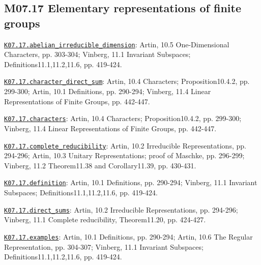 \subsection*{M07.17 Elementary representations of finite groups}
\par\smallskip\noindent\hypertarget{src:K07.17.abelian_irreducible_dimension}{}\label{src:K07.17.abelian_irreducible_dimension}\hyperref[K07.17.abelian_irreducible_dimension]{\texttt{K07.17.abelian\_irreducible\_dimension}}: Artin, 10.5 One-Dimensional Characters, pp. 303-304; Vinberg, 11.1 Invariant Subspaces; Definitions11.1,11.2,11.6, pp. 419-424.
\par\smallskip\noindent\hypertarget{src:K07.17.character_direct_sum}{}\label{src:K07.17.character_direct_sum}\hyperref[K07.17.character_direct_sum]{\texttt{K07.17.character\_direct\_sum}}: Artin, 10.4 Characters; Proposition10.4.2, pp. 299-300; Artin, 10.1 Definitions, pp. 290-294; Vinberg, 11.4 Linear Representations of Finite Groups, pp. 442-447.
\par\smallskip\noindent\hypertarget{src:K07.17.characters}{}\label{src:K07.17.characters}\hyperref[K07.17.characters]{\texttt{K07.17.characters}}: Artin, 10.4 Characters; Proposition10.4.2, pp. 299-300; Vinberg, 11.4 Linear Representations of Finite Groups, pp. 442-447.
\par\smallskip\noindent\hypertarget{src:K07.17.complete_reducibility}{}\label{src:K07.17.complete_reducibility}\hyperref[K07.17.complete_reducibility]{\texttt{K07.17.complete\_reducibility}}: Artin, 10.2 Irreducible Representations, pp. 294-296; Artin, 10.3 Unitary Representations; proof of Maschke, pp. 296-299; Vinberg, 11.2 Theorem11.38 and Corollary11.39, pp. 430-431.
\par\smallskip\noindent\hypertarget{src:K07.17.definition}{}\label{src:K07.17.definition}\hyperref[K07.17.definition]{\texttt{K07.17.definition}}: Artin, 10.1 Definitions, pp. 290-294; Vinberg, 11.1 Invariant Subspaces; Definitions11.1,11.2,11.6, pp. 419-424.
\par\smallskip\noindent\hypertarget{src:K07.17.direct_sums}{}\label{src:K07.17.direct_sums}\hyperref[K07.17.direct_sums]{\texttt{K07.17.direct\_sums}}: Artin, 10.2 Irreducible Representations, pp. 294-296; Vinberg, 11.1 Complete reducibility, Theorem11.20, pp. 424-427.
\par\smallskip\noindent\hypertarget{src:K07.17.examples}{}\label{src:K07.17.examples}\hyperref[K07.17.examples]{\texttt{K07.17.examples}}: Artin, 10.1 Definitions, pp. 290-294; Artin, 10.6 The Regular Representation, pp. 304-307; Vinberg, 11.1 Invariant Subspaces; Definitions11.1,11.2,11.6, pp. 419-424.
